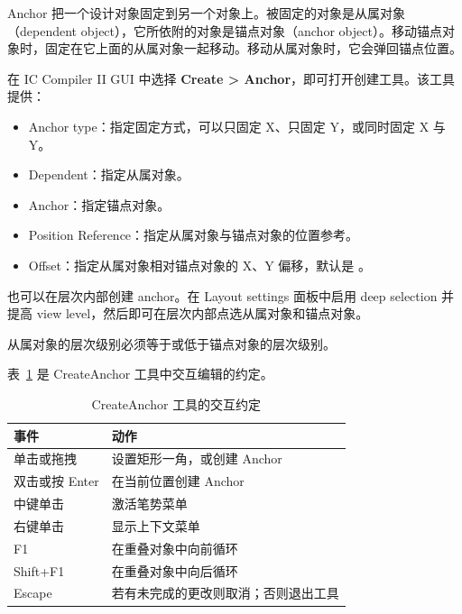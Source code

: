 \label{chap:gui-anchor}

Anchor 把一个设计对象固定到另一个对象上。被固定的对象是从属对象（dependent object），它所依附的对象是锚点对象（anchor object）。移动锚点对象时，固定在它上面的从属对象一起移动。移动从属对象时，它会弹回锚点位置。

在 IC Compiler II GUI 中选择 \textbf{Create > Anchor}，即可打开创建工具。该工具提供：
\begin{itemize}
  \item Anchor type：指定固定方式，可以只固定 X、只固定 Y，或同时固定 X 与 Y。
  \item Dependent：指定从属对象。
  \item Anchor：指定锚点对象。
  \item Position Reference：指定从属对象与锚点对象的位置参考。
  \item Offset：指定从属对象相对锚点对象的 X、Y 偏移，默认是 。
\end{itemize}

也可以在层次内部创建 anchor。在 Layout settings 面板中启用 deep selection 并提高 view level，然后即可在层次内部点选从属对象和锚点对象。

\begin{noteBox}
从属对象的层次级别必须等于或低于锚点对象的层次级别。
\end{noteBox}

表~\ref{tab:gui-anchor} 是 CreateAnchor 工具中交互编辑的约定。

\begin{table}[htbp]
\centering
\caption{CreateAnchor 工具的交互约定}
\label{tab:gui-anchor}
\begin{tabularx}{\textwidth}{@{}l X@{}}
\toprule
事件 & 动作 \\
\midrule
单击或拖拽 & 设置矩形一角，或创建 Anchor \\
双击或按 Enter & 在当前位置创建 Anchor \\
中键单击 & 激活笔势菜单 \\
右键单击 & 显示上下文菜单 \\
F1 & 在重叠对象中向前循环 \\
Shift+F1 & 在重叠对象中向后循环 \\
Escape & 若有未完成的更改则取消；否则退出工具 \\
\bottomrule
\end{tabularx}
\end{table}
